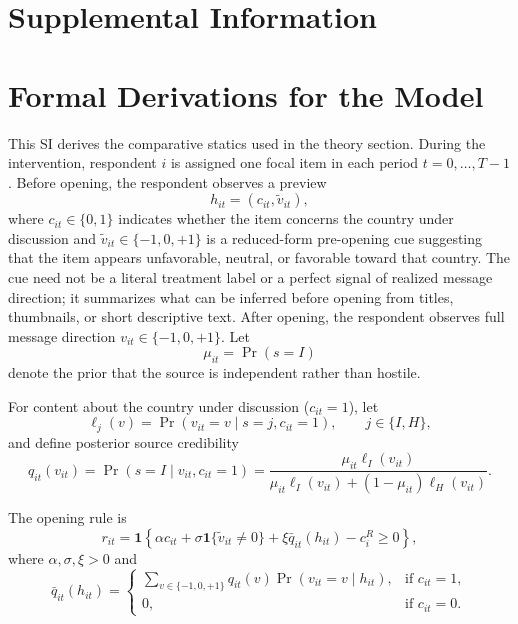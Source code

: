 \documentclass[12pt,american]{article}
\begin{document}
	\newpage
	\begin{refsection}
		
		\appendix
		\section*{Supplemental Information}
		\onehalfspacing
		\startcontents[sections]
		\thispagestyle{empty}
		
		\newpage
		\singlespacing
		\hypersetup{pageanchor=false}
		\renewcommand{\thepage}{SI-\arabic{page}}
		\setcounter{page}{1}
		\setcounter{figure}{0}
		\setcounter{table}{0}
		\setcounter{footnote}{0}
		
		\section{Formal Derivations for the Model}
		\label{app:formal_proofs}
		
		This SI derives the comparative statics used in the theory section. During the intervention, respondent \(i\) is assigned one focal item in each period \(t=0,\dots,T-1\). Before opening, the respondent observes a preview
		\[
		h_{it}=(c_{it},\tilde v_{it}),
		\]
		where \(c_{it}\in\{0,1\}\) indicates whether the item concerns the country under discussion and \(\tilde v_{it}\in\{-1,0,+1\}\) is a reduced-form pre-opening cue suggesting that the item appears unfavorable, neutral, or favorable toward that country. The cue need not be a literal treatment label or a perfect signal of realized message direction; it summarizes what can be inferred before opening from titles, thumbnails, or short descriptive text. After opening, the respondent observes full message direction \(v_{it}\in\{-1,0,+1\}\). Let
		\[
		\mu_{it}=\Pr(s=I)
		\]
		denote the prior that the source is independent rather than hostile.
		
		For content about the country under discussion (\(c_{it}=1\)), let
		\[
		\ell_j(v)=\Pr(v_{it}=v\mid s=j,c_{it}=1), \qquad j\in\{I,H\},
		\]
		and define posterior source credibility
		\[
		q_{it}(v_{it})=\Pr(s=I\mid v_{it},c_{it}=1)
		=\frac{\mu_{it}\ell_I(v_{it})}{\mu_{it}\ell_I(v_{it})+(1-\mu_{it})\ell_H(v_{it})}.
		\]
		
		The opening rule is
		\[
		r_{it}=\mathbf{1}\left\{\alpha c_{it}+\sigma \mathbf{1}\{\tilde v_{it}\neq 0\}+\xi \bar q_{it}(h_{it})-c_i^R\ge 0\right\},
		\]
		where \(\alpha,\sigma,\xi>0\) and
		\[
		\bar q_{it}(h_{it})=
		\begin{cases}
			\sum_{v\in\{-1,0,+1\}} q_{it}(v)\Pr(v_{it}=v\mid h_{it}), & \text{if } c_{it}=1,\\
			0, & \text{if } c_{it}=0.
		\end{cases}
		\]
		

\end{refsection}
\end{document}
